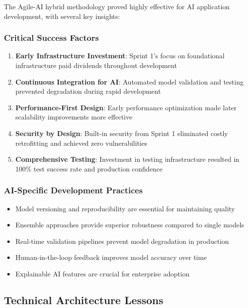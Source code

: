 The Agile-AI hybrid methodology proved highly effective for AI application development, with several key insights:

\subsubsection{Critical Success Factors}

\begin{enumerate}[leftmargin=*]
    \item \textbf{Early Infrastructure Investment}: Sprint 1's focus on foundational infrastructure paid dividends throughout development
    \item \textbf{Continuous Integration for AI}: Automated model validation and testing prevented degradation during rapid development
    \item \textbf{Performance-First Design}: Early performance optimization made later scalability improvements more effective
    \item \textbf{Security by Design}: Built-in security from Sprint 1 eliminated costly retrofitting and achieved zero vulnerabilities
    \item \textbf{Comprehensive Testing}: Investment in testing infrastructure resulted in 100\% test success rate and production confidence
\end{enumerate}

\subsubsection{AI-Specific Development Practices}

\begin{itemize}
    \item Model versioning and reproducibility are essential for maintaining quality
    \item Ensemble approaches provide superior robustness compared to single models
    \item Real-time validation pipelines prevent model degradation in production
    \item Human-in-the-loop feedback improves model accuracy over time
    \item Explainable AI features are crucial for enterprise adoption
\end{itemize}

\subsection{Technical Architecture Lessons}

